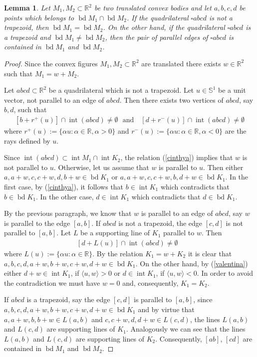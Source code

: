 \documentclass[12pt]{amsart}
\newcommand{\Rd}{\mathbb{R}^2}
\newcommand{\inte}{\operatorname*{int}}
\newcommand{\bd}{\operatorname*{bd}}
\newtheorem{lemma}{Lemma}
\begin{document}
\begin{lemma}\label{parcera}
Let $M_1,M_2\subset \Rd$ be two translated convex bodies and let $a,b,c,d$ be points which belongs to $\bd M_1\cap \bd M_2$. If the quadrilateral $\square abcd$ is not a trapezoid, then $\bd M_1=\bd M_2$. On the other hand, if the quadrilateral $\square abcd$ is a trapezoid and $\bd M_1\not= \bd M_2$, then the pair of parallel edges of $\square abcd$ is contained in $\bd M_1$ and $\bd M_2$.
\end{lemma}
\begin{proof}
Since the convex figures $M_1,M_2\subset \Rd$ are translated there exists $w\in \Rd$ such that $M_1=w+M_2$.

Let $abcd \subset \mathbb{R}^2$ be a quadrilateral which is not a trapezoid.
Let $u\in \mathbb{S}^1$ be a unit vector, not parallel to an edge of $abcd$. Then there exists two vertices of $abcd$, say $b,d$,  such that 
\begin{eqnarray}\label{cinthya}
[b+r^+(u)]\cap \inte (abcd)\not= \emptyset \textrm{ }\textrm{and } \textrm{ }[d+r^{-}(u)]\cap \inte (abcd)\not= \emptyset
\end{eqnarray}
where $r^+(u):=\{\alpha u: \alpha \in \mathbb{R}, \alpha>0 \}$ and $r^{-}(u):=\{\alpha u: \alpha \in \mathbb{R}, \alpha<0 \}$ are the rays defined by $u$. 

Since $\inte (abcd) \subset \inte M_1 \cap \inte K_2$, the relation (\ref{cinthya}) implies that $w$ is not parallel to $u$. O\-ther\-wise, let us assume that $w$ is parallel to $u$. Then either $a,a+w,c,c+w,d,b+w\in \bd K_1$ or $a,a+w,c,c+w,b,d+w\in \bd K_1$. In the first case, by (\ref{cinthya}), it follows that $b\in \inte K_1$ which contradicts that $b\in \bd K_1$. In the other case,  $d\in \inte K_1$ which contradicts that $d\in \bd K_1$.

By the previous paragraph, we know that $w$ is parallel to an edge of $abcd$, say $w$ is parallel to the edge $[a,b]$. If $abcd$ is not a trapezoid, the edge $[c,d]$ is not parallel to $[a,b]$. Let $L$ be a supporting line of $K_1$ parallel to $w$. Then 
\begin{eqnarray}\label{valentina}
[d+L(u)]\cap \inte (abcd)\not= \emptyset \textrm{ } 
\end{eqnarray}
where $L(u):=\{\alpha u: \alpha \in \mathbb{R}\}$. By the relation $K_1=w+K_2$ it is clear that  $a,b,c,d,a+w,b+w,c+w,d+w\in \bd K_1$. On the other hand, by (\ref{valentina}) either $d+w\in \inte K_1$, if $\langle u,  w\rangle>0$ or $d\in \inte K_1$, if $\langle u,  w\rangle<0$. In order to avoid the contradiction we must have $w=0$ and, consequently, $K_1=K_2$.

If $abcd$ is a trapezoid, say the edge $[c,d]$ is  parallel to $[a,b]$, since $a,b,c,d,a+w,b+w,c+w,d+w\in \bd K_1$ and by virtue that $a,a+w,b, b+w\in L(a,b)$ and $c,c+w,d,d+w\in L(c,d)$, the lines $L(a,b)$ and $L(c,d)$ are supporting lines of $K_1$. Analogously we can see that 
the lines $L(a,b)$ and $L(c,d)$ are supporting lines of $K_2$.
Consequently, $[ab]$, $[cd]$ are contained in $\bd M_1$ and $\bd M_2$. 
\end{proof}
\end{document}
